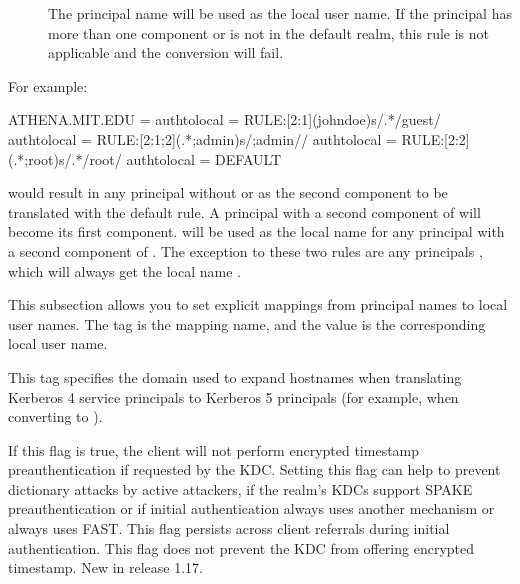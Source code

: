 \documentclass[letterpaper,10pt,english]{sphinxmanual}
\begin{document}
\begin{description}
\begin{description}
\item[{}] \leavevmode
\sphinxAtStartPar
The principal name will be used as the local user name.  If
the principal has more than one component or is not in the
default realm, this rule is not applicable and the conversion
will fail.

\end{description}

\sphinxAtStartPar
For example:

\begin{sphinxVerbatim}[commandchars=\\\{\}]
[realms]
    ATHENA.MIT.EDU = \PYGZob{}
        auth\PYGZus{}to\PYGZus{}local = RULE:[2:\PYGZdl{}1](johndoe)s/\PYGZca{}.*\PYGZdl{}/guest/
        auth\PYGZus{}to\PYGZus{}local = RULE:[2:\PYGZdl{}1;\PYGZdl{}2](\PYGZca{}.*;admin\PYGZdl{})s/;admin\PYGZdl{}//
        auth\PYGZus{}to\PYGZus{}local = RULE:[2:\PYGZdl{}2](\PYGZca{}.*;root)s/\PYGZca{}.*\PYGZdl{}/root/
        auth\PYGZus{}to\PYGZus{}local = DEFAULT
    \PYGZcb{}
\end{sphinxVerbatim}

\sphinxAtStartPar
would result in any principal without  or  as the
second component to be translated with the default rule.  A
principal with a second component of  will become its
first component.   will be used as the local name for any
principal with a second component of .  The exception to
these two rules are any principals , which will
always get the local name .

\item[{\sphinxstylestrong{auth\_to\_local\_names}}] \leavevmode
\sphinxAtStartPar
This subsection allows you to set explicit mappings from principal
names to local user names.  The tag is the mapping name, and the
value is the corresponding local user name.

\item[{\sphinxstylestrong{default\_domain}}] \leavevmode
\sphinxAtStartPar
This tag specifies the domain used to expand hostnames when
translating Kerberos 4 service principals to Kerberos 5 principals
(for example, when converting  to
).

\item[{\sphinxstylestrong{disable\_encrypted\_timestamp}}] \leavevmode
\sphinxAtStartPar
If this flag is true, the client will not perform encrypted
timestamp preauthentication if requested by the KDC.  Setting this
flag can help to prevent dictionary attacks by active attackers,
if the realm’s KDCs support SPAKE preauthentication or if initial
authentication always uses another mechanism or always uses FAST.
This flag persists across client referrals during initial
authentication.  This flag does not prevent the KDC from offering
encrypted timestamp.  New in release 1.17.


\end{description}
\end{document}
